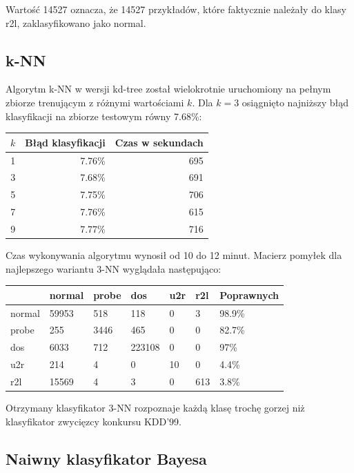 \documentclass[a4paper, 12pt]{article}
\begin{document}
Wartość 14527 oznacza, że 14527 przykładów, które faktycznie należały do klasy r2l, zaklasyfikowano
jako normal.

\subsection{k-NN}

Algorytm k-NN w wersji kd-tree został wielokrotnie uruchomiony na pełnym zbiorze trenującym
z różnymi wartościami $k$.
Dla $k=3$ osiągnięto najniższy błąd klasyfikacji na zbiorze testowym równy 7.68\%:

\begin{table}[H]
\centering
\begin{tabular}{ | r | r | r | } \hline
$k$ & Błąd klasyfikacji & Czas w sekundach \\ \hline
1 & 7.76\% & 695 \\ \hline
3 & 7.68\% & 691 \\ \hline
5 & 7.75\% & 706 \\ \hline
7 & 7.76\% & 615 \\ \hline
9 & 7.77\% & 716 \\ \hline
\end{tabular} 
\end{table}

Czas wykonywania algorytmu wynosił od 10 do 12 minut.
Macierz pomyłek dla najlepszego wariantu 3-NN wyglądała następująco:

\begin{table}[H]
\centering
\begin{tabular}{ | l | l | l | l | l | l | l | } \hline
	& normal & probe & dos 	& u2r 	& r2l 	& Poprawnych	\\ \hline
normal 	& 59953 & 518 	& 118	& 0	& 3 	& 98.9\% 	\\ \hline
probe 	& 255 	& 3446 	& 465	& 0	& 0 	& 82.7\% 	\\ \hline
dos 	& 6033 	& 712 	& 223108& 0 	& 0 	& 97\% 		\\ \hline
u2r 	& 214 	& 4 	& 0	& 10	& 0	& 4.4\%		\\ \hline
r2l 	& 15569 & 4 	& 3	& 0	& 613	& 3.8\%		\\ \hline
\end{tabular} 
\end{table}

Otrzymany klasyfikator 3-NN rozpoznaje każdą klasę trochę gorzej niż klasyfikator zwycięzcy
konkursu KDD'99.

\subsection{Naiwny klasyfikator Bayesa}
\end{document}
